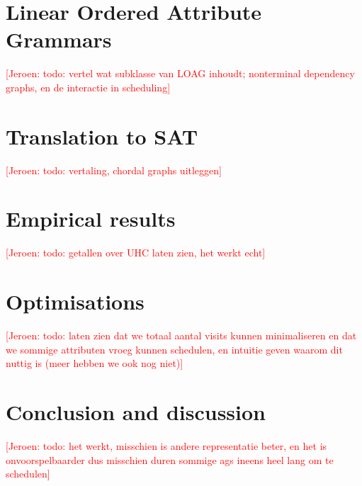 \documentclass{llncs}
\newif\iffinal\finalfalse
\newcommand{\REM}[3]{\iffinal\else\textcolor{#2}{[#1: #3]}\fi}
\newcommand{\Jeroen}[1]{\REM{Jeroen}{red}{#1}}
\DeclareRobustCommand{\VAN}[3]{#2}
\begin{document}
\section{Linear Ordered Attribute Grammars} \label{sect:loag}
\Jeroen{todo: vertel wat subklasse van LOAG inhoudt; nonterminal dependency graphs, en de interactie in scheduling}

\section{Translation to SAT} \label{sect:translation}
\Jeroen{todo: vertaling, chordal graphs uitleggen}

\section{Empirical results} \label{sect:results}
\Jeroen{todo: getallen over UHC laten zien, het werkt echt}

\section{Optimisations} \label{sect:optimisations}
\Jeroen{todo: laten zien dat we totaal aantal visits kunnen minimaliseren en dat we sommige attributen vroeg kunnen schedulen, en intuitie geven waarom dit nuttig is (meer hebben we ook nog niet)}

\section{Conclusion and discussion} \label{sect:conclusion}
\Jeroen{todo: het werkt, misschien is andere representatie beter, en het is onvoorspelbaarder dus misschien duren sommige ags ineens heel lang om te schedulen}


\DeclareRobustCommand{\VAN}[3]{#3}


\end{document}
